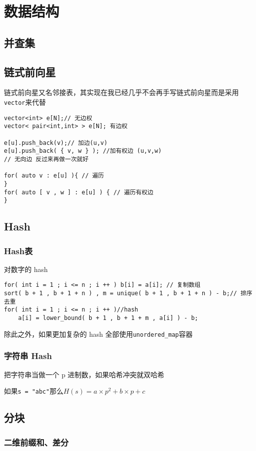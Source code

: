 \chapter{数据结构}

\section{并查集}



\section{链式前向星}
链式前向星又名邻接表，其实现在我已经几乎不会再手写链式前向星而是采用\verb|vector|来代替
\begin{lstlisting}
vector<int> e[N];// 无边权
vector< pair<int,int> > e[N]; 有边权

e[u].push_back(v);// 加边(u,v)
e[u].push_back( { v, w } ); //加有权边 (u,v,w)
// 无向边 反过来再做一次就好

for( auto v : e[u] ){ // 遍历
}
for( auto [ v , w ] : e[u] ) { // 遍历有权边
}

\end{lstlisting}

\section{Hash}
\subsection{Hash表}
对数字的 hash
\begin{lstlisting}
for( int i = 1 ; i <= n ; i ++ ) b[i] = a[i]; // 复制数组
sort( b + 1 , b + 1 + n ) , m = unique( b + 1 , b + 1 + n ) - b;// 排序去重
for( int i = 1 ; i <= n ; i ++ )//hash
    a[i] = lower_bound( b + 1 , b + 1 + m , a[i] ) - b;
\end{lstlisting}
除此之外，如果更加复杂的 hash 全部使用\verb|unordered_map|容器
\subsection{字符串 Hash}
把字符串当做一个 p 进制数，如果哈希冲突就双哈希

如果\verb|s = "abc"|那么$H(s) = a\times p^2 + b\times p + c $








\section{分块}




\subsection{二维前缀和、差分}


